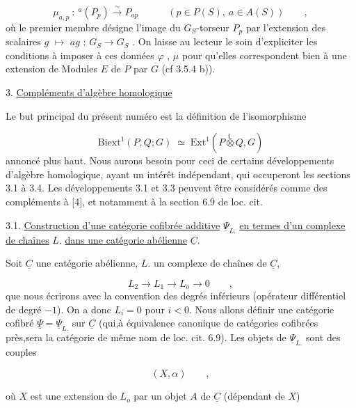 \begin{equation*}
\mu_{a,p} \ :\ {}^a(P_p) \overset{\sim}{\longrightarrow} P_{ap} \qquad\quad (p \in P(S),\ a \in A(S)) \qquad ,
\end{equation*}
où le premier  membre désigne l'image du $G_S$-torseur $P_p$ par l'extension
des scalaires $g$ $\longmapsto$ $ag$ : $G_S \longrightarrow G_S$ . On laisse au lecteur le soin d'expliciter les conditions à imposer à ces données $\varphi$ , $\mu$ pour qu'elles correspondent bien à une extension de Modules $E$ de $P$ par $G$  (cf 3.5.4 b)).


3. \underline{Compléments d'algèbre homologique}

Le but principal du présent numéro est la définition de l'isomorphisme

\begin{equation*}
\mathrm{Biext}^1(P,Q;G) \;\simeq\; \mathrm{Ext}^1(P \overset{\mathbb{L}}{\otimes} Q,G)
\end{equation*}
annoncé plus haut. Nous aurons besoin pour ceci de certains développements d'algèbre homologique, ayant un intérêt indépendant, qui occuperont les sections 3.1  à 3.4. Les développements 3.1 et 3.3 peuvent être considérés comme des compléments à [4], et notamment à la section 6.9 de loc. cit.


3.1.  \underline{Construction d'une catégorie cofibrée additive} $\underline{\Psi}_{L.}$ \underline{en termes d'un complexe de chaînes} $L.$ \underline{dans une catégorie abélienne} $\underline{C}$.

Soit $\underline{C}$ une catégorie abélienne, $L.$ un complexe de chaînes de $\underline{C}$,

\begin{equation}\tag{3.1.1}
L_2 \longrightarrow L_1 \longrightarrow L_o \longrightarrow 0 \qquad ,
\end{equation}
que nous écrirons avec la convention des degrés inférieurs (opérateur différentiel de degré $-1$). On a donc $L_i = 0$ pour $i < 0$. Nous allons définir une catégorie cofibré $\underline{\Psi} = \underline{\Psi}_{L.}$ sur $\underline{C}$ (qui,à équivalence canonique de catégories cofibrées près,sera la catégorie de même nom de loc. cit. 6.9). Les objets de $\underline{\Psi}_{L.}$ sont des couples

\begin{equation*}
(X , \alpha) \qquad , 
\end{equation*}


 où $X$ est une extension de $L_o$ par un objet $A$ de $\underline{C}$ (dépendant de $X$)

